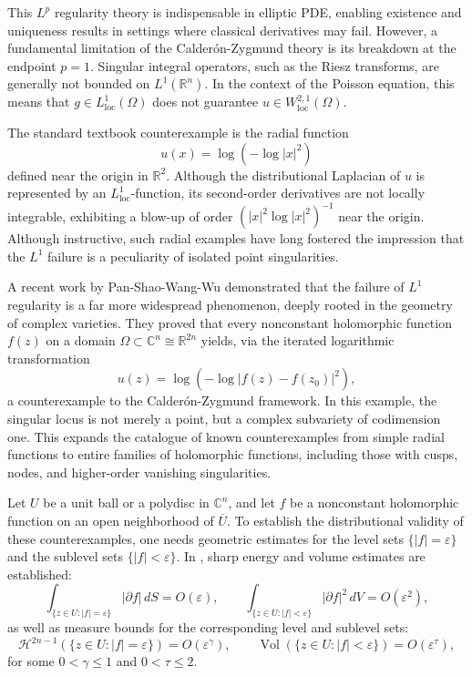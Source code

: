 \documentclass[12pt,twoside]{amsart}
\numberwithin{equation}{section}
\numberwithin{definition}{section} %
\begin{document}
This \(L^p\) regularity theory is indispensable in elliptic PDE, enabling existence and uniqueness results in settings where classical derivatives may fail. However, a fundamental limitation of the Calder\'on-Zygmund theory is its breakdown at the endpoint \(p = 1\). Singular integral operators, such as the Riesz transforms, are generally not bounded on \(L^1(\mathbb{R}^n)\). In the context of the Poisson equation, this means that \(g \in L_{\mathrm{loc}}^1(\Omega)\) does not guarantee \(u \in W_{\mathrm{loc}}^{2,1}(\Omega)\).

The standard textbook counterexample is the radial function
\[
u(x) = \log(-\log |x|^2)
\]
defined near the origin in \(\mathbb{R}^2\). Although the distributional Laplacian of \(u\) is represented by an \(L_{\mathrm{loc}}^1\)-function, its second-order derivatives are not locally integrable, exhibiting a blow-up of order \((|x|^2\log |x|^2)^{-1}\) near the origin. Although instructive, such radial examples have long fostered the impression that the \(L^1\) failure is a peculiarity of isolated point singularities.

A recent work by Pan-Shao-Wang-Wu \cite{psww2026} demonstrated that the failure of \(L^1\) regularity is a far more widespread phenomenon, deeply rooted in the geometry of complex varieties. They proved that every nonconstant holomorphic function \(f(z)\) on a domain \(\Omega \subset \mathbb{C}^n \cong \mathbb{R}^{2n}\) yields, via the iterated logarithmic transformation
\[
u(z) = \log(-\log |f(z) - f(z_0)|^2),
\]
a counterexample to the Calder\'on-Zygmund framework. In this example, the singular locus is not merely a point, but a complex subvariety of codimension one. This expands the catalogue of known counterexamples from simple radial functions to entire families of holomorphic functions, including those with cusps, nodes, and higher-order vanishing singularities.

Let $U$ be a unit ball or a polydisc in $\mathbb{C}^n$, and let $f$ be a nonconstant holomorphic function on an open neighborhood of $\overline{U}$. To establish the distributional validity of these counterexamples, one needs geometric estimates for the level sets \(\{|f| = \varepsilon\}\) and the sublevel sets \(\{|f| < \varepsilon\}\). In \cite[Theorem 1.1, Theorem 1.2]{psww2026}, sharp energy and volume estimates are established:
\[
\int_{\{z\in U: |f|=\varepsilon\}} |\partial f|\,dS = O(\varepsilon),\qquad \int_{\{z\in U: |f|<\varepsilon\}} |\partial f|^2\,dV = O(\varepsilon^2),
\]
as well as measure bounds for the corresponding level and sublevel sets:
\[
\mathcal{H}^{2n-1}(\{z\in U: |f|=\varepsilon\}) = O(\varepsilon^\gamma),\qquad \operatorname{Vol}(\{z\in U: |f|<\varepsilon\}) = O(\varepsilon^\tau),
\]
for some \(0 < \gamma \leq 1\) and \(0 < \tau \leq 2\). 
\end{document}

